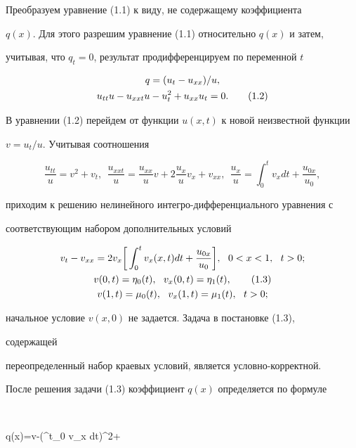 Преобразуем уравнение (1.1) к виду, не содержащему коэффициента 


$q(x)$. Для этого разрешим уравнение (1.1) относительно $q(x)$ и затем, 


учитывая, что $q_t=0$, результат продифференцируем по переменной $t$ 


\begin{gather} 


q=(u_t-u_{xx})/u,\notag \\


u_{tt}u-u_{xx t}u-u^2_t+u_{xx}u_t=0. \tag{1.2} 


\end{gather} 


В уравнении (1.2) перейдем от функции $u(x,t)$ к новой неизвестной функции 


$v=u_t/u$. Учитывая соотношения 


$$ 


\frac{u_{tt}}{u}=v^2+v_t,\ \ \frac{u_{xx t}}{u}= 


\frac{u_{xx}}{u}v+2\frac{u_x}{u}v_x+v_{xx},\ \ 


\frac{u_x}{u}=\int^t_0 v_x dt+\frac{u_{0x}}{u_0}, 


$$ 


приходим к решению нелинейного интегро-дифференциального уравнения с 


соответствующим набором дополнительных условий 


\begin{gather} 


v_t-v_{xx}=2v_x\bigg[\int^t_0 v_x(x,t)dt+\frac{u_{0x}}{u_0}\bigg], 


\ \ 0<x<1,\ \ t>0;\notag \\ 


v(0,t)=\eta_0(t),\ \ v_x(0,t)=\eta_1(t),\tag{1.3} \\ 


v(1,t)=\mu_0(t), \ \ v_x(1,t)=\mu_1(t),\ \ t>0;\notag 


\end{gather} 


начальное условие $v(x,0)$ не задается. Задача в постановке (1.3), 


содержащей 


переопределенный набор краевых условий, является условно-корректной. 


После решения задачи (1.3) коэффициент $q(x)$ определяется по формуле 


$$ 


q(x)=v-\bigg(\int^t_0 v_x dt\bigg)^2+ 


